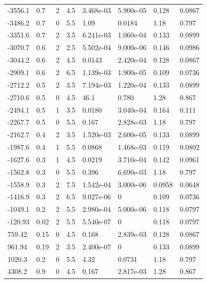 \documentclass[preview]{standalone}
\begin{document}
{{\begin{tabular}{L{1.2cm}C{1.2cm} C{0.3cm}C{0.5cm} C{1.4cm}C{1.4cm} C{1.4cm}C{1.4cm}}
  -3556.1  &   0.7  & 2     & 4.5 &  3.468e-03  & 5.900e-05  & 0.128 &  0.0867   \\ 
  -3486.2  &   0.7  & 0     & 5.5 &  1.09  & 0.0184  & 1.18 &  0.797   \\ 
  -3351.6  &   0.7  & 2     & 3.5 &  6.241e-03  & 1.060e-04  & 0.133 &  0.0899   \\ 
  -3070.7  &   0.6  & 2     & 2.5 &  5.502e-04  & 9.000e-06  & 0.146 &  0.0986   \\ 
  -3044.2  &   0.6  & 2     & 4.5 &  0.0143  & 2.420e-04  & 0.128 &  0.0867   \\ 
  -2909.1  &   0.6  & 2     & 6.5 &  1.139e-03  & 1.900e-05  & 0.109 &  0.0736   \\ 
  -2712.2  &   0.5  & 2     & 3.5 &  7.194e-03  & 1.220e-04  & 0.133 &  0.0899   \\ 
  -2710.6  &   0.5  & 0     & 4.5 &  46.1  & 0.780  & 1.28 &  0.867   \\ 
  -2494.1  &   0.5  & 1     & 3.5 &  0.0180  & 3.040e-04  & 0.164 &  0.111   \\ 
  -2267.7  &   0.5  & 0     & 5.5 &  0.167  & 2.828e-03  & 1.18 &  0.797   \\ 
  -2162.7  &   0.4  & 2     & 3.5 &  1.520e-03  & 2.600e-05  & 0.133 &  0.0899   \\ 
  -1987.6  &   0.4  & 1     & 5.5 &  0.0868  & 1.468e-03  & 0.119 &  0.0802   \\ 
  -1627.6  &   0.3  & 1     & 4.5 &  0.0219  & 3.710e-04  & 0.142 &  0.0961   \\ 
  -1562.8  &   0.3  & 0     & 5.5 &  0.396  & 6.690e-03  & 1.18 &  0.797   \\ 
  -1558.9  &   0.3  & 2     & 7.5 &  1.542e-04  & 3.000e-06  & 0.0958 &  0.0648   \\ 
  -1416.9  &   0.3  & 2     & 6.5 &  9.027e-06  & 0  & 0.109 &  0.0736   \\ 
  -1049.1  &   0.2  & 2     & 5.5 &  2.980e-04  & 5.000e-06  & 0.118 &  0.0797   \\ 
  -120.93  &  0.02  & 2     & 5.5 &  5.540e-07  & 0  & 0.118 &  0.0797   \\ 
  759.42  &  0.15  & 0     & 4.5 &  0.168  & 2.839e-03  & 0.128 &  0.0867   \\ 
  961.94  &  0.19  & 2     & 3.5 &  2.400e-07  & 0  & 0.133 &  0.0899   \\ 
  1020.3  &   0.2  & 0     & 5.5 &  4.32  & 0.0731  & 1.18 &  0.797   \\ 
  4308.2  &   0.9  & 0     & 4.5 &  0.167  & 2.817e-03  & 1.28 &  0.867   \\ 

\end{tabular}}}
\end{document}
